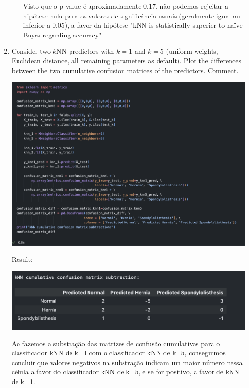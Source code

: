 \documentclass[12pt]{article}
\begin{document}
\begin{enumerate}[leftmargin=\labelsep]
\begin{enumerate}
        Visto que o p-value é aproximadamente 0.17, não podemos rejeitar a hipótese nula para os valores de significância usuais (geralmente igual ou inferior a 0.05), a favor da hipótese "kNN is statistically superior to naïve Bayes regarding accuracy".
    \end{enumerate}

    \item Consider two $k$NN predictors with $k = 1$ and $k = 5$ (uniform weights, Euclidean distance,
    all remaining parameters as default). Plot the differences between the two cumulative confusion
    matrices of the predictors. Comment.

    \begin{center}
        \includegraphics[scale=0.3]{images/code7.png}
    \end{center}

    Result:

    \begin{center}
        \includegraphics[scale=0.6]{images/table1.png}
    \end{center}

    Ao fazemos a substração das matrizes de confusão cumulativas para o classificador kNN de k=1 com o classificador kNN de k=5, conseguimos concluir que valores negativos na substração indicam um maior número nessa célula a favor do classificador kNN de k=5, e se for positivo, a favor de kNN de k=1.


\end{enumerate}
\end{document}
